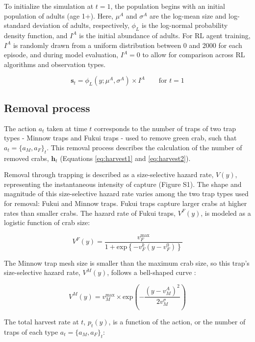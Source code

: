 \documentclass{article}
\begin{document}
To initialize the simulation at $t=1$, the population begins with an initial population of adults (age 1+). Here, $\mu^A$ and $\sigma^A$ are the log-mean size and log-standard deviation of adults, respectively, $\phi_L$ is the log-normal probability density function, and $I^A$ is the initial abundance of adults. For RL agent training, $I^A$ is randomly drawn from a uniform distribution between 0 and 2000 for each episode, and during model evaluation, $I^A = 0$ to allow for comparison across RL algorithms and observation types.

\begin{equation}
\textbf{s}_t = \phi_L(y; \mu^A, \sigma^A) \times I^A \qquad \text{for } t=1
\end{equation}

\subsection{Removal process}

The action $a_t$ taken at time $t$ corresponds to the number of traps of two trap types - Minnow traps and Fukui traps - used to remove green crab, such that $a_t=\{a_M, a_F\}_t$. This removal process describes the calculation of the number of removed crabs, $\textbf{h}_t$ (Equations \eqref{eq:harvest1} and \eqref{eq:harvest2}).

Removal through trapping is described as a size-selective hazard rate, $V(y)$, representing the instantaneous intensity of capture \parencite{ergon2018utility} (Figure S1). The shape and magnitude of this size-selective hazard rate varies among the two trap types used for removal: Fukui and Minnow traps. Fukui traps capture larger crabs at higher rates than smaller crabs. The hazard rate of Fukui traps, $V^F(y)$, is modeled as a logistic function of crab size:

\begin{equation}
V^F(y) = \frac{v^{\text{max}}_F}{1+\text{exp}\left\{-v^k_F(y-v^0_F)\right\}}
\end{equation}

The Minnow trap mesh size is smaller than the maximum crab size, so this trap's size-selective hazard rate, $V^M(y)$, follows a bell-shaped curve \parencite{jorgensen2009size}:

\begin{equation}
V^M(y) = v^{\text{max}}_M \times \text{exp}(-\frac{(y-v^{A}_M)^2}{2 v^{\sigma}_M})
\end{equation}

The total harvest rate at $t$, $p_t(y)$, is a function of the action, or the number of traps of each type $a_t=\{a_M, a_F\}_t$:
\end{document}
